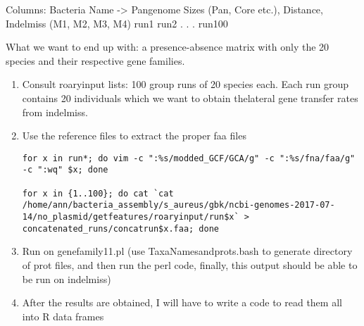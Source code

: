 \documentclass[12pt]{article}
\begin{document}


Columns: Bacteria Name -> Pangenome Sizes (Pan, Core etc.), Distance, Indelmiss (M1, M2, M3, M4)
run1
run2
.
.
.
run100

What we want to end up with: a presence-absence matrix with only
the 20 species and their respective gene families.

\begin{enumerate}

\item Consult roaryinput lists: 100 group runs of 20 species each.
Each run group contains 20 individuals which we want to obtain thelateral gene transfer rates from indelmiss.

\item Use the reference files to extract the proper faa files  

\begin{lstlisting}
for x in run*; do vim -c ":%s/modded_GCF/GCA/g" -c ":%s/fna/faa/g" -c ":wq" $x; done

for x in {1..100}; do cat `cat /home/ann/bacteria_assembly/s_aureus/gbk/ncbi-genomes-2017-07-14/no_plasmid/getfeatures/roaryinput/run$x` > concatenated_runs/concatrun$x.faa; done

\end{lstlisting}


\item Run on genefamily11.pl (use TaxaNamesandprots.bash to generate directory of prot files, and then run the perl code, finally, this output should be able to be run on indelmiss)



\item After the results are obtained, I will have to write a code to read them all into R data frames

\end{enumerate}
\end{document}

